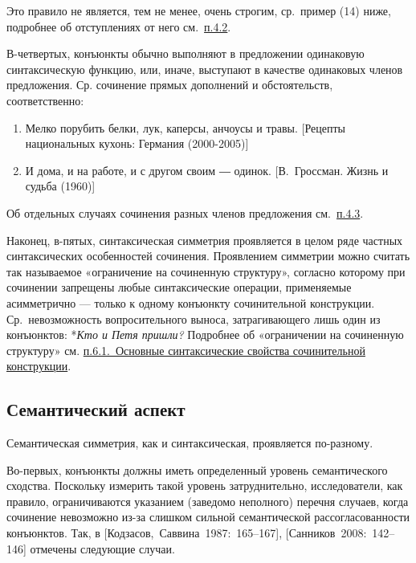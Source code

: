 Это правило не является, тем не менее, очень строгим, ср.~пример (14)
ниже, подробнее об отступлениях от него см.~\underline{п.4.2}.

В-четвертых, конъюнкты обычно выполняют в предложении одинаковую
синтаксическую функцию, или, иначе, выступают в качестве одинаковых
членов предложения. Ср. сочинение прямых дополнений и обстоятельств,
соответственно:

\begin{enumerate}
\def\labelenumi{(\arabic{enumi})}
\setcounter{enumi}{12}
\item
  Мелко порубить белки, лук, каперсы, анчоусы и травы. {[}Рецепты
  национальных кухонь: Германия (2000-2005){]}
\item
  И дома, и на работе, и с другом своим ― одинок. {[}В.~Гроссман. Жизнь
  и судьба (1960){]}
\end{enumerate}

Об отдельных случаях сочинения разных членов предложения
см.~\underline{п.4.3}.

Наконец, в-пятых, синтаксическая симметрия проявляется в целом ряде
частных синтаксических особенностей сочинения. Проявлением симметрии
можно считать так называемое «ограничение на сочиненную структуру»,
согласно которому при сочинении запрещены любые синтаксические операции,
применяемые асимметрично --- только к одному конъюнкту сочинительной
конструкции. Ср.~невозможность вопросительного выноса, затрагивающего
лишь один из конъюнктов: *\textit{Кто и Петя пришли?} Подробнее об
«ограничении на сочиненную структуру» см. \underline{п.6.1.~Основные
синтаксические свойства сочинительной конструкции}.

\subsection{Семантический
аспект}\label{ux441ux435ux43cux430ux43dux442ux438ux447ux435ux441ux43aux438ux439-ux430ux441ux43fux435ux43aux442}

Семантическая симметрия, как и синтаксическая, проявляется по-разному.

Во-первых, конъюнкты должны иметь определенный уровень семантического
сходства. Поскольку измерить такой уровень затруднительно,
исследователи, как правило, ограничиваются указанием (заведомо
неполного) перечня случаев, когда сочинение невозможно из-за слишком
сильной семантической рассогласованности конъюнктов. Так, в
{[}Кодзасов,~Саввина~1987:~165--167{]}, {[}Санников~2008:~142--146{]}
отмечены следующие случаи.

